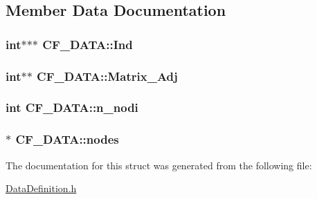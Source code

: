\subsection{Member Data Documentation}
\hypertarget{structCF__DATA_a21b2ca110fc0b01950a783ef9e9c2628}{
\subsubsection[{Ind}]{\setlength{\rightskip}{0pt plus 5cm}int$\ast$$\ast$$\ast$ C\-F\-\_\-\-D\-A\-T\-A\-::\-Ind}}\label{structCF__DATA_a21b2ca110fc0b01950a783ef9e9c2628}
\hypertarget{structCF__DATA_a33150ceb864cb8ff1fcf8bfbb2d01efe}{
\subsubsection[{Matrix\-\_\-\-Adj}]{\setlength{\rightskip}{0pt plus 5cm}int$\ast$$\ast$ C\-F\-\_\-\-D\-A\-T\-A\-::\-Matrix\-\_\-\-Adj}}\label{structCF__DATA_a33150ceb864cb8ff1fcf8bfbb2d01efe}
\hypertarget{structCF__DATA_a50c302ea5a7570881d844eb0b2a6c930}{
\subsubsection[{n\-\_\-nodi}]{\setlength{\rightskip}{0pt plus 5cm}int C\-F\-\_\-\-D\-A\-T\-A\-::n\-\_\-nodi}}\label{structCF__DATA_a50c302ea5a7570881d844eb0b2a6c930}
\hypertarget{structCF__DATA_aa790d2fc6304b584e3d6a5afb95cf5c4}{
\subsubsection[{nodes}]{$\ast$ C\-F\-\_\-\-D\-A\-T\-A\-::nodes}}\label{structCF__DATA_aa790d2fc6304b584e3d6a5afb95cf5c4}


The documentation for this struct was generated from the following file\-:\begin{DoxyCompactItemize}
\item 
\hyperlink{DataDefinition_8h}{Data\-Definition.\-h}\end{DoxyCompactItemize}
